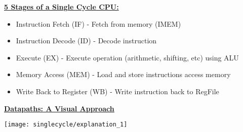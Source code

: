 \begin{blocksection}
\textbf{\underline{5 Stages of a Single Cycle CPU:}}

\begin{itemize}
    \item Instruction Fetch (IF) - Fetch from memory (IMEM) 
    \item Instruction Decode (ID) - Decode instruction
    \item Execute (EX) - Execute operation (arithmetic, shifting, etc) using ALU
    \item Memory Access (MEM) - Load and store instructions access memory
    \item Write Back to Register (WB) - Write instruction back to RegFile
\end{itemize}
\bigskip
\textbf{\underline{Datapaths: A Visual Approach}}

\texttt{[image: singlecycle/explanation\_1]}

\end{blocksection}